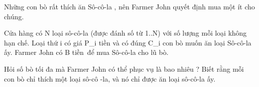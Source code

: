 Những con bò rất thích ăn Sô-cô-la , nên Farmer John quyết định mua một ít cho chúng.

Cửa hàng có N loại sô-cô-la (được đánh số từ 1..N) với số lượng mỗi loại không hạn chế. Loại thứ i có giá P\_i tiền và có đúng C\_i con bò muốn ăn loại Sô-cô-la ấy. Farmer John có B tiền để mua Sô-cô-la cho lũ bò.

Hỏi số bò tối đa mà Farmer John có thể phục vụ là bao nhiêu ? Biết rằng mỗi con bò chỉ thích một loại sô-cô -la, và nó chỉ được ăn loại sô-cô-la ấy.

\